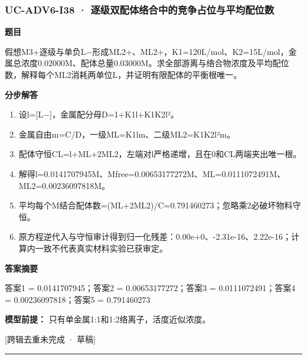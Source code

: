 \documentclass[UTF8,11pt,a4paper]{ctexart}
\begin{document}
\subsubsection*{UC-ADV6-I38 · 逐级双配体络合中的竞争占位与平均配位数}
\noindent\textbf{题目}\par
假想M3+逐级与单负L−形成ML2+、ML2+，K1=120L/mol、K2=15L/mol，金属总浓度0.02000M、配体总量0.03000M。求全部游离与络合物浓度及平均配位数，解释每个ML2消耗两单位L，并证明有限配体的平衡根唯一。\par
\medskip\noindent\textbf{分步解答}
\begin{enumerate}
\item 设l=[L−]，金属配分母D=1+K1l+K1K2l²。
\item 金属自由m=C/D，一级ML=K1lm、二级ML2=K1K2l²m。
\item 配体守恒CL=l+ML+2ML2，左端对l严格递增，且在0和CL两端夹出唯一根。
\item 解得l=0.0141707945M、Mfree=0.00653177272M、ML=0.0111072491M、ML2=0.00236097818M。
\item 平均每个M结合配体数=(ML+2ML2)/C=0.791460273；忽略乘2必破坏物料守恒。
\item 原方程逆代入与守恒审计得到归一化残差：0.00e+0、-2.31e-16、2.22e-16；计算内一致不代表真实材料实验已获审定。
\end{enumerate}
\noindent\textbf{答案摘要}\par
答案1 = 0.0141707945；答案2 = 0.00653177272；答案3 = 0.0111072491；答案4 = 0.00236097818；答案5 = 0.791460273\par
\noindent\textbf{模型前提：}
只有单金属1:1和1:2络离子，活度近似浓度。\par
\noindent\textcolor{red!65!black}{[跨辑去重未完成 · 草稿]} \par
\medskip\hrule\medskip
{}
\end{document}
